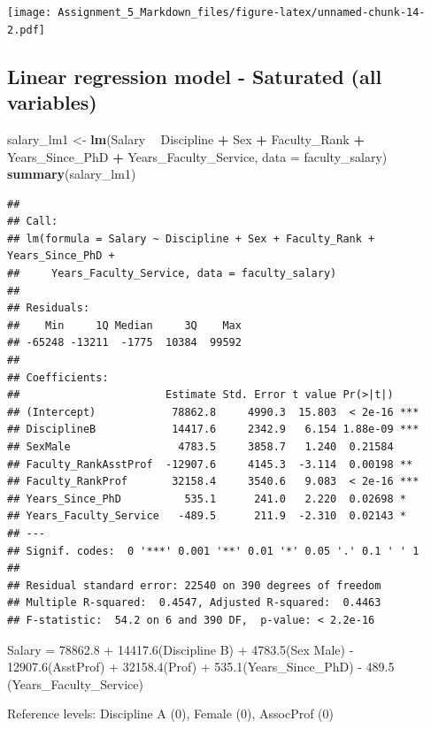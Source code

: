 \documentclass[]{article}
\newenvironment{Shaded}{\begin{snugshade}}{\end{snugshade}}
\newcommand{\KeywordTok}[1]{\textcolor[rgb]{0.13,0.29,0.53}{\textbf{#1}}}
\newcommand{\DataTypeTok}[1]{\textcolor[rgb]{0.13,0.29,0.53}{#1}}
\newcommand{\StringTok}[1]{\textcolor[rgb]{0.31,0.60,0.02}{#1}}
\newcommand{\OperatorTok}[1]{\textcolor[rgb]{0.81,0.36,0.00}{\textbf{#1}}}
\newcommand{\NormalTok}[1]{#1}
\begin{document}
\texttt{[image: Assignment\_5\_Markdown\_files/figure-latex/unnamed-chunk-14-2.pdf]}

\subsection{Linear regression model - Saturated (all
variables)}\label{linear-regression-model---saturated-all-variables}

\begin{Shaded}
\begin{Highlighting}[]
\NormalTok{salary_lm1 <-}\StringTok{ }\KeywordTok{lm}\NormalTok{(Salary }\OperatorTok{~}\StringTok{ }\NormalTok{Discipline }\OperatorTok{+}\StringTok{ }\NormalTok{Sex }\OperatorTok{+}\StringTok{ }\NormalTok{Faculty_Rank }\OperatorTok{+}\StringTok{ }\NormalTok{Years_Since_PhD }\OperatorTok{+}\StringTok{ }\NormalTok{Years_Faculty_Service, }\DataTypeTok{data =}\NormalTok{ faculty_salary)}
\KeywordTok{summary}\NormalTok{(salary_lm1)}
\end{Highlighting}
\end{Shaded}

\begin{verbatim}
## 
## Call:
## lm(formula = Salary ~ Discipline + Sex + Faculty_Rank + Years_Since_PhD + 
##     Years_Faculty_Service, data = faculty_salary)
## 
## Residuals:
##    Min     1Q Median     3Q    Max 
## -65248 -13211  -1775  10384  99592 
## 
## Coefficients:
##                       Estimate Std. Error t value Pr(>|t|)    
## (Intercept)            78862.8     4990.3  15.803  < 2e-16 ***
## DisciplineB            14417.6     2342.9   6.154 1.88e-09 ***
## SexMale                 4783.5     3858.7   1.240  0.21584    
## Faculty_RankAsstProf  -12907.6     4145.3  -3.114  0.00198 ** 
## Faculty_RankProf       32158.4     3540.6   9.083  < 2e-16 ***
## Years_Since_PhD          535.1      241.0   2.220  0.02698 *  
## Years_Faculty_Service   -489.5      211.9  -2.310  0.02143 *  
## ---
## Signif. codes:  0 '***' 0.001 '**' 0.01 '*' 0.05 '.' 0.1 ' ' 1
## 
## Residual standard error: 22540 on 390 degrees of freedom
## Multiple R-squared:  0.4547, Adjusted R-squared:  0.4463 
## F-statistic:  54.2 on 6 and 390 DF,  p-value: < 2.2e-16
\end{verbatim}

Salary = 78862.8 + 14417.6(Discipline B) + 4783.5(Sex Male) -
12907.6(AsstProf) + 32158.4(Prof) + 535.1(Years\_Since\_PhD) - 489.5
(Years\_Faculty\_Service)

Reference levels: Discipline A (0), Female (0), AssocProf (0)
\end{document}
